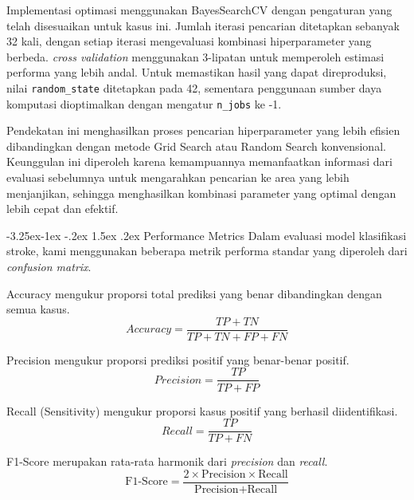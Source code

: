 \documentclass[10pt]{article}
\makeatletter
\renewcommand\subsection{\@startsection{subsection}{2}{\z@}%
  {-3.25ex\@plus -1ex \@minus -.2ex}%
  {1.5ex \@plus .2ex}%
  {\normalfont\itshape\normalsize}}
\makeatother
\begin{document}
\begin{multicols}{2}
    Implementasi optimasi menggunakan BayesSearchCV dengan pengaturan yang telah
    disesuaikan untuk kasus ini. Jumlah iterasi pencarian ditetapkan sebanyak 32
    kali, dengan setiap iterasi mengevaluasi kombinasi hiperparameter yang berbeda.
    \textit{cross validation} menggunakan 3-lipatan untuk memperoleh estimasi
    performa yang lebih andal. Untuk memastikan hasil yang dapat direproduksi,
    nilai \texttt{random\_state} ditetapkan pada 42, sementara penggunaan sumber
    daya komputasi dioptimalkan dengan mengatur \texttt{n\_jobs} ke -1.

    Pendekatan ini menghasilkan proses pencarian hiperparameter yang lebih efisien
    dibandingkan dengan metode Grid Search atau Random Search konvensional.
    Keunggulan ini diperoleh karena kemampuannya memanfaatkan informasi dari
    evaluasi sebelumnya untuk mengarahkan pencarian ke area yang lebih menjanjikan,
    sehingga menghasilkan kombinasi parameter yang optimal dengan lebih cepat dan
    efektif.

    \subsection{Performance Metrics}
    Dalam evaluasi model klasifikasi stroke, kami menggunakan beberapa metrik
    performa standar yang diperoleh dari \textit{confusion matrix}.

    Accuracy mengukur proporsi total prediksi yang benar dibandingkan dengan semua
    kasus.
    \begin{equation}
        Accuracy = \frac{TP + TN}{TP + TN + FP + FN}
    \end{equation}

    Precision mengukur proporsi prediksi positif yang benar-benar positif.
    \begin{equation}
        Precision = \frac{TP}{TP + FP}
    \end{equation}

    Recall (Sensitivity) mengukur proporsi kasus positif yang berhasil
    diidentifikasi.
    \begin{equation}
        Recall = \frac{TP}{TP + FN}
    \end{equation}

    F1-Score merupakan rata-rata harmonik dari \textit{precision} dan
    \textit{recall}.
    \begin{equation}
        \text{F1-Score} = \frac{2 \times \text{Precision} \times \text{Recall}}{\text{Precision} + \text{Recall}}
    \end{equation}


\end{multicols}
\end{document}
